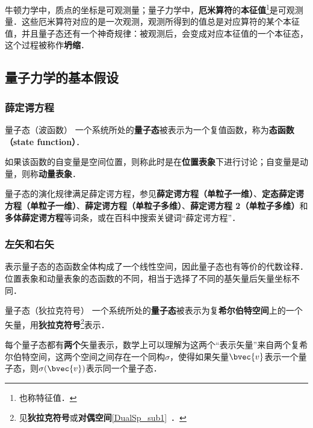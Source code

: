 牛顿力学中，质点的坐标是可观测量；量子力学中，\textbf{厄米算符}的\textbf{本征值}\footnote{也称特征值．}是可观测量．这些厄米算符对应的是一次观测，观测所得到的值总是对应算符的某个本征值，并且量子态还有一个神奇规律：被观测后，会变成对应本征值的一个本征态，这个过程被称作\textbf{坍缩}．



\subsection{量子力学的基本假设}


\subsubsection{薛定谔方程}

\begin{definition}{量子态（波函数）}
一个系统所处的\textbf{量子态}被表示为一个复值函数，称为\textbf{态函数（state function）}．

如果该函数的自变量是空间位置，则称此时是在\textbf{位置表象}下进行讨论；自变量是动量，则称\textbf{动量表象}．
\end{definition}

量子态的演化规律满足薛定谔方程，参见\textbf{薛定谔方程（单粒子一维）}、\textbf{定态薛定谔方程（单粒子一维）}、\textbf{薛定谔方程（单粒子多维）}、\textbf{薛定谔方程 2（单粒子多维）}和\textbf{多体薛定谔方程}等词条，或在百科中搜索关键词“薛定谔方程”．

\subsubsection{左矢和右矢}

表示量子态的态函数全体构成了一个线性空间，因此量子态也有等价的代数诠释．位置表象和动量表象的态函数的不同，相当于选择了不同的基矢量后矢量坐标不同．

\begin{definition}{量子态（狄拉克符号）}
一个系统所处的\textbf{量子态}被表示为复\textbf{希尔伯特空间}上的一个矢量，用\textbf{狄拉克符号}\footnote{见\textbf{狄拉克符号}或\textbf{对偶空间}\autoref{DualSp_sub1}~．}表示．

每个量子态都有\textbf{两个}矢量表示，数学上可以理解为这两个“表示矢量”来自两个复希尔伯特空间，这两个空间之间存在一个同构$\sigma$，使得如果矢量$\bvec{v}$表示一个量子态，则$\sigma(\bvec{v})$表示同一个量子态．

\end{definition}


